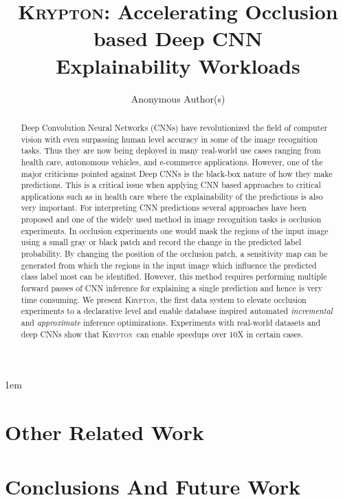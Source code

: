 \documentclass[10pt, sigconf]{acmart}
\newcommand{\system}{\textsc{Krypton}}
\begin{document}
\emergencystretch 1em

\title{\textsc{Krypton}: Accelerating Occlusion based Deep CNN\\ Explainability Workloads}

\author{Anonymous Author(s)}


\begin{abstract}
Deep Convolution Neural Networks (CNNs) have revolutionized the field of computer vision with even surpassing human level accuracy in some of the image recognition tasks. Thus they are now being deployed in many real-world use cases ranging from health care, autonomous vehicles, and e-commerce applications. However, one of the major criticisms pointed against Deep CNNs is the black-box nature of how they make predictions. This is a critical issue when applying CNN based approaches to critical applications such as in health care where the explainability of the predictions is also very important. For interpreting CNN predictions several approaches have been proposed and one of the widely used method in image recognition tasks is occlusion experiments. In occlusion experiments one would mask the regions of the input image using a small gray or black patch and record the change in the predicted label probability. By changing the position of the occlusion patch, a sensitivity map can be generated from which the regions in the input image which influence the predicted class label most can be identified. However, this method requires performing multiple forward passes of CNN inference for explaining a single prediction and hence is very time consuming.
We present \system, the first data system to elevate occlusion experiments to a declarative level and enable database inspired automated \textit{incremental} and \textit{approximate} inference optimizations. Experiments with real-world datasets and deep CNNs show that \system~can enable speedups over 10X in certain cases.
\end{abstract}

\maketitle











\section{Other Related Work}

\section{Conclusions And Future Work}





\end{document}
